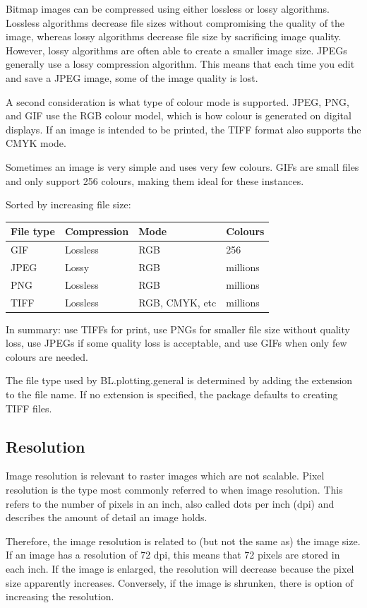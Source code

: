 \documentclass[letterpaper]{report}\usepackage[]{graphicx}\usepackage[]{color}
\begin{document}
Bitmap images can be compressed using either lossless or lossy algorithms. Lossless algorithms decrease file sizes without compromising the quality of the image, whereas lossy algorithms decrease file size by sacrificing image quality. However, lossy algorithms are often able to create a smaller image size. JPEGs generally use a lossy compression algorithm. This means that each time you edit and save a JPEG image, some of the image quality is lost. 

A second consideration is what type of colour mode is supported. JPEG, PNG, and GIF use the RGB colour model, which is how colour is generated on digital displays. If an image is intended to be printed, the TIFF format also supports the CMYK mode.

Sometimes an image is very simple and uses very few colours. GIFs are small files and only support 256 colours, making them ideal for these instances.

Sorted by increasing file size:
\begin{center}
\begin{tabular}{l l l l }
\hline
File type & Compression & Mode & Colours \\
\hline
GIF & Lossless & RGB & 256 \\
JPEG &  Lossy & RGB & millions\\
PNG &Lossless & RGB &  millions \\
TIFF & Lossless & RGB, CMYK, etc & millions \\
\end{tabular}
\end{center}
\bigskip
In summary: use TIFFs for print, use PNGs for smaller file size without quality loss, use JPEGs if some quality loss is acceptable, and use GIFs when only few colours are needed.

The file type used by BL.plotting.general is determined by adding the extension to the file name. If no extension is specified, the package defaults to creating TIFF files.

\subsection{Resolution}
Image resolution is relevant to raster images which are not scalable. Pixel resolution is the type most commonly referred to when image resolution. This refers to the number of pixels in an inch, also called dots per inch (dpi) and describes the amount of detail an image holds.

Therefore, the image resolution is related to (but not the same as) the image size. If an image has a resolution of 72 dpi, this means that 72 pixels are stored in each inch. If the image is enlarged, the resolution will decrease because the pixel size apparently increases. Conversely, if the image is shrunken, there is option of increasing the resolution.
\end{document}
